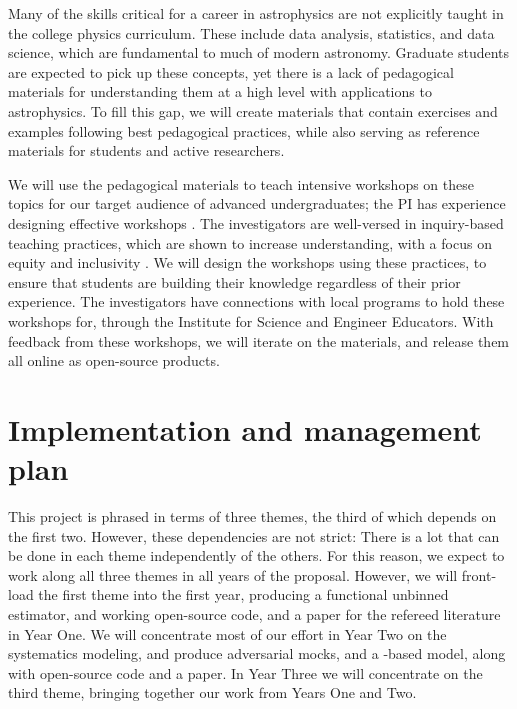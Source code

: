 \documentclass[12pt, fullpage, letterpaper]{article}
\begin{document}
Many of the skills critical for a career in astrophysics are not explicitly taught in the college physics curriculum. 
These include data analysis, statistics, and data science, which are fundamental to much of modern astronomy.
Graduate students are expected to pick up these concepts, yet there is a lack of pedagogical materials for understanding them at a high level with applications to astrophysics.
To fill this gap, we will create materials that contain exercises and examples following best pedagogical practices, while also serving as reference materials for students and active researchers.

We will use the pedagogical materials to teach intensive workshops on these topics for our target audience of advanced undergraduates; the PI has experience designing effective workshops \citep{Huppenkothen2018}.
The investigators are well-versed in inquiry-based teaching practices, which are shown to increase understanding, with a focus on equity and inclusivity \citep{Ball2010}.
We will design the workshops using these practices, to ensure that students are building their knowledge regardless of their prior experience.
The investigators have connections with local programs to hold these workshops for, through the Institute for Science and Engineer Educators. 
With feedback from these workshops, we will iterate on the materials, and release them all online as open-source products.

\section{Implementation and management plan}

This project is phrased in terms of three themes, the third of which depends on the
first two.
However, these dependencies are not strict: There is a lot that can be done in each theme
independently of the others.
For this reason, we expect to work along all three themes in all years of the proposal.
However, we will front-load the first theme into the first year, producing a functional
unbinned estimator, and working open-source code, and a paper for the refereed literature in Year One.
We will concentrate most of our effort in Year Two on the systematics modeling, and produce
adversarial mocks, and a \GP-based model, along with open-source code and a paper.
In Year Three we will concentrate on the third theme, bringing together our work from Years One and Two.
\end{document}
